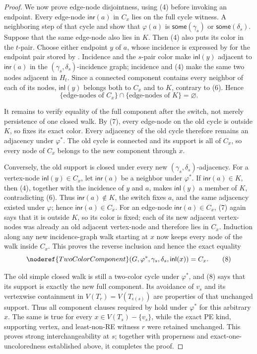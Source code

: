 \begin{proof}
We now prove edge-node disjointness, using (4) before invoking an endpoint.
Every edge-node \(\mathsf{inr}(a)\) in \(C_x\) lies on the full cycle
witness.  A neighboring step of that cycle and
 show that
\(\varphi(a)\) is \(\mathsf{some}(\gamma_s)\) or
\(\mathsf{some}(\delta_s)\).  Suppose that the same edge-node also lies
in \(K\).  Then (4) also puts its color in the \(t\)-pair.  Choose either
endpoint \(y\) of \(a\), whose incidence is expressed by
 for the endpoint pair stored by
.  Incidence and the \(s\)-pair color make
\(\mathsf{inl}(y)\) adjacent to \(\mathsf{inr}(a)\) in the
\((\gamma_s,\delta_s)\)-incidence graph; incidence and (4) make the same
two nodes adjacent in \(H_t\).  Since a connected component contains
every neighbor of each of its nodes, \(\mathsf{inl}(y)\) belongs both to
\(C_x\) and to \(K\), contrary to (6).  Hence
\[
 \{\text{edge-nodes of }C_x\}\cap
 \{\text{edge-nodes of }K\}=\varnothing.                      \tag{7}
\]

It remains to verify equality of the full component after the switch, not
merely persistence of one closed walk.  By (7), every edge-node on the old
cycle is outside \(K\), so  fixes its exact
color.  Every adjacency of the old cycle therefore remains an adjacency
under \(\varphi^*\).  The old cycle is connected and its support is all of
\(C_x\), so every node of \(C_x\) belongs to the new component through
\(x\).

Conversely, the old support is closed under every new
\((\gamma_s,\delta_s)\)-adjacency.  For a vertex-node
\(\mathsf{inl}(y)\in C_x\), let \(\mathsf{inr}(a)\) be a neighbor under
\(\varphi^*\).  If \(\mathsf{inr}(a)\in K\), then (4), together with the
incidence of \(y\) and \(a\), makes \(\mathsf{inl}(y)\) a member of
\(K\), contradicting (6).  Thus \(\mathsf{inr}(a)\notin K\), the switch
fixes \(a\), and the same adjacency existed under \(\varphi\); hence
\(\mathsf{inr}(a)\in C_x\).  For an edge-node
\(\mathsf{inr}(a)\in C_x\), (7) again says that it is outside \(K\), so
its color is fixed; each of its new adjacent vertex-nodes was already an
old adjacent vertex-node and therefore lies in \(C_x\).  Induction along
any new incidence-graph walk starting at \(x\) now keeps every node of the
walk inside \(C_x\).  This proves the reverse inclusion and hence the
exact equality
\[
 \noderef{TwoColorComponent}(G,\varphi^*,
       \gamma_s,\delta_s,\mathsf{inl}(x))=C_x.                 \tag{8}
\]

The old simple closed walk is still a two-color cycle under
\(\varphi^*\), and (8) says that its support is exactly the new full
component.  Its avoidance of \(v_s\) and its vertexwise containment in
\(V(T_r)=V(T_{\epsilon(s)})\) are properties of that unchanged support.
Thus all component clauses required by
 hold under \(\varphi^*\) for this
arbitrary \(x\).  The same is true for every
\(x\in V(T_s)-\{v_s\}\), while the exact PE kind, supporting vertex, and
least-non-RE witness \(r\) were retained unchanged.  This proves strong
interchangeability at \(s\); together with properness and
exact-one-uncoloredness established above, it completes the proof.
\end{proof}
